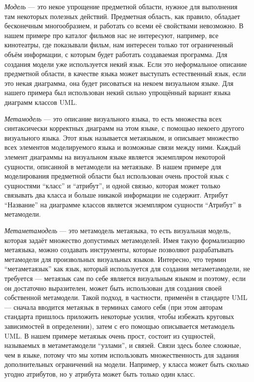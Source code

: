 \textit{Модель} --- это некое упрощение предметной области, нужное для выполнения там 
некоторых полезных действий. Предметная область, как правило, обладает 
бесконечным многообразием, и работать со всеми её свойствами невозможно. 
В нашем примере про каталог фильмов нас не интересуют, например, все кинотеатры, 
где показывали фильм, нам интересен только тот ограниченный объём информации,
с которым будет работать создаваемая программа. Для создания модели уже 
используется некий язык. Если это неформальное описание предметной области, в 
качестве языка может выступать естественный язык, если это некая диаграмма, она 
будет рисоваться на некоем визуальном языке. Для нашего примера был использован 
некий сильно упрощённый вариант языка диаграмм классов \ac{UML}.

\textit{Метамодель} --- это описание визуального языка, то есть множества всех 
синтаксически корректных диаграмм на этом языке, с помощью некоего другого 
визуального языка. Этот язык называется метаязыком, и описывает множество всех 
элементов моделируемого языка и возможные связи между ними. Каждый элемент 
диаграммы на визуальном языке является экземпляром некоторой сущности, описанной 
в метамодели на метаязыке. В нашем примере для моделирования предметной области 
был использован очень простой язык с сущностями "`класс"' и "`атрибут"', и одной 
связью, которая может только связывать два класса и больше никакой информации 
не содержит. Атрибут "`Название"' на диаграмме классов является экземпляром 
сущности "`Атрибут"' в метамодели.

\textit{Метаметамодель} --- это метамодель метаязыка, то есть визуальная модель, 
которая задаёт множество допустимых метамоделей. Имея такую формализацию 
метаязыка, можно создавать инструменты, которые позволяют разрабатывать 
метамодели для произвольных визуальных языков. Интересно, что термин 
"`метаметаязык"' как язык, который используется для создания метаметамодели, 
не требуется --- метаязык сам по себе является визуальным языком и поэтому, 
если он достаточно выразителен, может быть использован для создания своей 
собственной метамодели. Такой подход, в частности, применён в стандарте \ac{UML} 
--- сначала вводится метаязык в терминах самого себя (при этом авторам стандарта 
пришлось приложить некоторые усилия, чтобы избежать круговых зависимостей в 
определении), затем с его помощью описывается метамодель \ac{UML}. В нашем примере 
метаязык очень прост, состоит из сущностей, называемых в метаметамодели 
"`узлами"', и связей. Связи здесь более сложные, чем в языке, потому что мы 
хотим использовать множественность для задания дополнительных ограничений на 
модели. Например, у класса может быть сколько угодно атрибутов, но у атрибута 
может быть только один класс.

